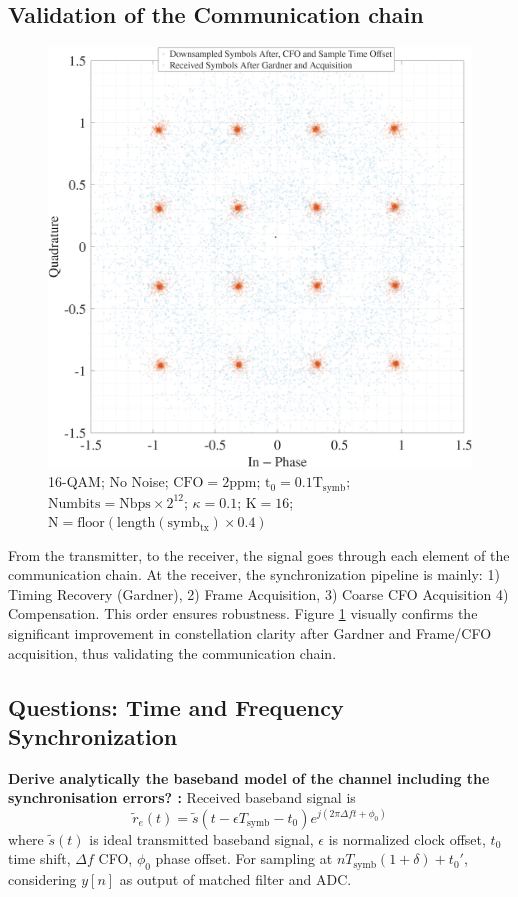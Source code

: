 \documentclass[11pt]{article}
\begin{document}
        \subsection{Validation of the Communication chain}
        \begin{figure}[H]
		\centering
		\includegraphics[width=0.55\linewidth]{Images/const-corrected.png} 
		\caption{16-QAM; No Noise; $\mathrm{CFO = 2 ppm}$; $\mathrm{t_0 = 0.1 T_{symb}}$; $\text{Numbits} = \text{Nbps} \times 2^{12}$; $\kappa = 0.1$; $\text{K} = 16$; $\mathrm{N = floor(length(symb_{tx}) \times 0.4)}$}
		\label{fig:const-corrected-after-sync}
	\end{figure}
        From the transmitter, to the receiver, the signal goes through each element of the communication chain. At the receiver, the synchronization pipeline is mainly: 1) Timing Recovery (Gardner), 2) Frame Acquisition, 3) Coarse CFO Acquisition 4) Compensation. This order ensures robustness. Figure \ref{fig:const-corrected-after-sync} visually confirms the significant improvement in constellation clarity after Gardner and Frame/CFO acquisition, thus validating the communication chain.
	
	
			
	\subsection{Questions: Time and Frequency Synchronization}
	\par\noindent\textbf{Derive analytically the baseband model of the channel including the synchronisation errors? :}\quad\ignorespaces 
		Received baseband signal is
		\begin{equation} \tilde{r}_e(t) = \tilde{s}(t-\epsilon T_{\text{symb}} - t_0) e^{j(2\pi\Delta f t + \phi_0)} \end{equation}
		where $\tilde{s}(t)$ is ideal transmitted baseband signal, $\epsilon$ is normalized clock offset, $t_0$ time shift, $\Delta f$ CFO, $\phi_0$ phase offset. For sampling at $nT_{\text{symb}}(1+\delta)+t_0'$, considering $y[n]$ as output of matched filter and ADC.
	\par
			
\end{document}
